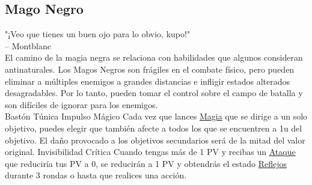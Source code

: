\thispagestyle{empty}
\subsection*{\huge Mago Negro}
\vspace{0.3cm}
"¡Veo que tienes un buen ojo para lo obvio, kupo!" \\
\indent -- Montblanc 
\vspace{0.3cm} \\
El camino de la magia negra se relaciona con habilidades que algunos consideran antinaturales. Los Magos Negros son frágiles en el combate físico, pero pueden eliminar a múltiples enemigos a grandes distancias e infligir estados alterados desagradables. Por lo tanto, pueden tomar el control sobre el campo de batalla y son difíciles de ignorar para los enemigos. \\
\vfill
{} {Bastón} {Túnica}
\vfill
{} {Impulso Mágico} { Cada vez que lances \hyperlink{action}{Magia} que se dirige a un solo objetivo, puedes elegir que también afecte a todos los que se encuentren a 1u del objetivo. El daño provocado a los objetivos secundarios será de la mitad del valor original. } {Invisibilidad Crítica} { Cuando tengas más de 1 PV y recibas un \hyperlink{action}{Ataque} que reduciría tus PV a 0, se reducirán a 1 PV y obtendrás el estado \hyperlink{status}{Reflejos} durante 3 rondas o hasta que realices una acción. }
\vfill
